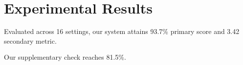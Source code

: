 \section{Experimental Results}\label{sec:results}

Evaluated across 16 settings, our system attains 93.7\% primary score and 3.42 secondary metric.

Our supplementary check reaches 81.5\%.
